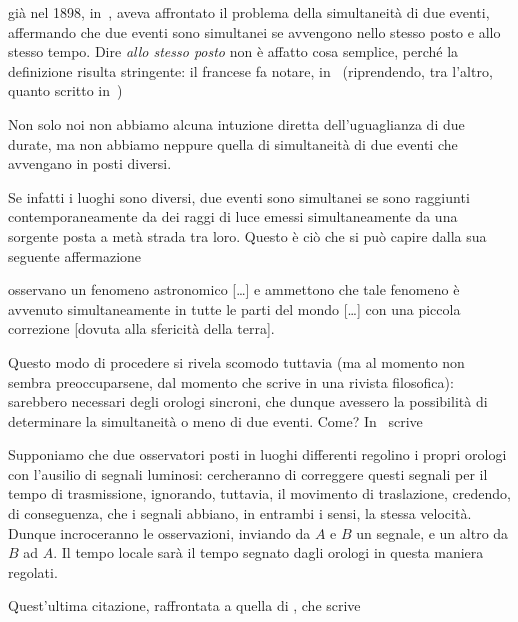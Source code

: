 \poin{} gi\`a nel 1898, in~\cite{carro5}, aveva affrontato il problema
della simultaneit\`a di due eventi, affermando che due eventi sono
simultanei se avvengono nello stesso posto e allo stesso tempo. Dire
\emph{allo stesso posto} non \`e affatto cosa semplice, perch\'e la
definizione risulta stringente: il francese fa notare, in~\cite{carro4}
(riprendendo, tra l'altro, quanto scritto in~\cite{carro5})
\begin{citaz}
  Non solo noi non abbiamo alcuna intuzione diretta dell'uguaglianza
  di due durate, ma non abbiamo neppure quella di simultaneit\`a di
  due eventi che avvengano in posti diversi.
\end{citaz}
Se infatti i luoghi sono diversi, due
eventi sono simultanei se sono raggiunti contemporaneamente da dei raggi
di luce emessi simultaneamente da una sorgente posta a met\`a strada tra
loro. Questo \`e ci\`o che si pu\`o capire dalla sua seguente
affermazione
\begin{citaz}
 [\ldots] osservano un fenomeno astronomico [\ldots] e ammettono che
 tale fenomeno \`e avvenuto simultaneamente in tutte le parti del mondo
 [\ldots] con una piccola correzione [dovuta alla sfericit\`a della terra].
\end{citaz}
Questo modo di procedere si rivela scomodo tuttavia (ma al momento
\poin{} non sembra preoccuparsene, dal momento che scrive in una rivista
filosofica): sarebbero necessari degli orologi sincroni, che dunque
avessero la possibilit\`a di determinare la simultaneit\`a o meno di due
eventi. Come?
In~\cite{carro3} scrive
\begin{citaz}
  Supponiamo che due osservatori posti in luoghi differenti regolino i
  propri orologi con l'ausilio di segnali luminosi: cercheranno di
  correggere questi segnali per il tempo di trasmissione, ignorando,
  tuttavia, il movimento di traslazione, credendo, di conseguenza, che
  i segnali abbiano, in entrambi i sensi, la stessa velocit\`a. Dunque
  incroceranno le osservazioni, inviando da $A$ e $B$ un segnale, e un
  altro da $B$ ad $A$. Il tempo locale sar\`a il tempo segnato dagli
  orologi in questa maniera regolati.
\end{citaz}
Quest'ultima citazione, raffrontata a quella di \ein{}, che scrive
